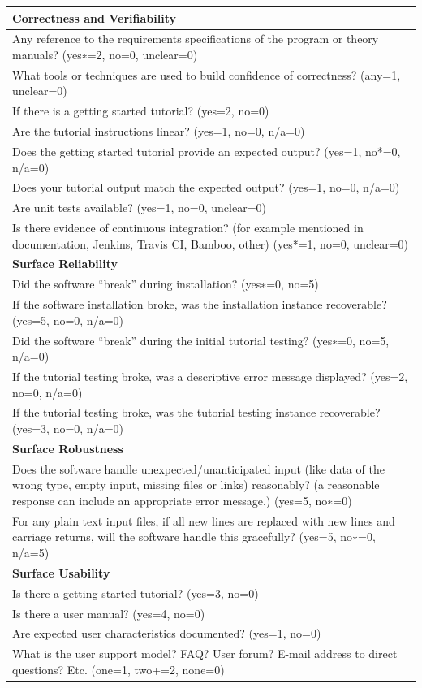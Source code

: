 \documentclass[12pt, notitlepage]{article}
\begin{document}
\begin{singlespace}
\def\arraystretch{1.33}
\begin{tabular}{p{16cm}}
	\hline		
	\textbf{Correctness and Verifiability}\\
	\hline
	Any reference to the requirements specifications of the program or theory manuals? ({yes∗=2, no=0, unclear=0})\\
	What tools or techniques are used to build confidence of correctness? (any=1, unclear=0)\\
	If there is a getting started tutorial? ({yes=2, no=0})\\
	Are the tutorial instructions linear? ({yes=1, no=0, n/a=0})\\
	Does the getting started tutorial provide an expected output? ({yes=1, no*=0, n/a=0})\\
	Does your tutorial output match the expected output? ({yes=1, no=0, n/a=0})\\
	Are unit tests available?  ({yes=1, no=0, unclear=0})\\
	Is there evidence of continuous integration? (for example mentioned in documentation, Jenkins, Travis CI, Bamboo, other) ({yes*=1, no=0, unclear=0})\\
	\hline	
	\textbf{Surface Reliability}\\
	\hline
	Did the software “break” during installation? ({yes∗=0, no=5})\\
	If the software installation broke, was the installation instance recoverable? ({yes=5, no=0, n/a=0})\\
	Did the software “break” during the initial tutorial testing? ({yes∗=0, no=5, n/a=0})\\
	If the tutorial testing broke, was a descriptive error message displayed? ({yes=2, no=0, n/a=0})\\
	If the tutorial testing broke, was the tutorial testing instance recoverable? ({yes=3, no=0, n/a=0})\\
	\hline		
	\textbf{Surface Robustness}\\
	\hline
	Does the software handle unexpected/unanticipated input (like data of the wrong type, empty input, missing files or links) reasonably? (a reasonable response can include an appropriate error message.) ({yes=5, no∗=0})\\
	For any plain text input files, if all new lines are replaced with new lines and carriage returns, will the software handle this gracefully? ({yes=5, no∗=0, n/a=5})\\
	\hline		
	\textbf{Surface Usability}\\
	\hline
	Is there a getting started tutorial? ({yes=3, no=0})\\
	Is there a user manual? ({yes=4, no=0})\\
	Are expected user characteristics documented? ({yes=1, no=0})\\
	What is the user support model? FAQ? User forum? E-mail address to direct questions? Etc. (one=1, two+=2, none=0)\\
	\hline
\end{tabular}


\end{singlespace}
\end{document}

